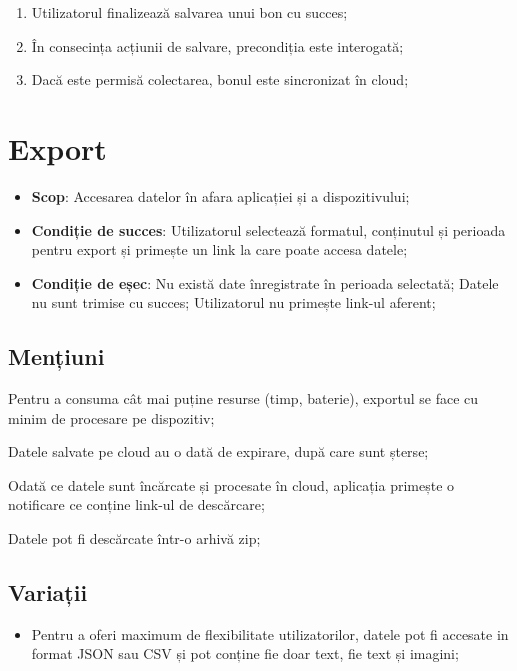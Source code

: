 \begin{enumerate}
\item
  Utilizatorul finalizează salvarea unui bon cu succes;
\item
  În consecința acțiunii de salvare, precondiția este interogată;
\item
  Dacă este permisă colectarea, bonul este sincronizat în cloud;
\end{enumerate}

\section{Export}\label{export}

\begin{itemize}
\item
  \textbf{Scop}: Accesarea datelor în afara aplicației și a dispozitivului;
\item
  \textbf{Condiție de succes}: Utilizatorul selectează formatul, conținutul și perioada pentru export și primește un link la care poate accesa datele;
\item
  \textbf{Condiție de eșec}: Nu există date înregistrate în perioada selectată; Datele nu sunt trimise cu succes; Utilizatorul nu primește link-ul aferent;
\end{itemize}

\subsection{Mențiuni}\label{menux21biuni-3}

Pentru a consuma cât mai puține resurse (timp, baterie), exportul se face cu minim de procesare pe dispozitiv;

Datele salvate pe cloud au o dată de expirare, după care sunt șterse;

Odată ce datele sunt încărcate și procesate în cloud, aplicația primește o notificare ce conține link-ul de descărcare;

Datele pot fi descărcate într-o arhivă zip;

\subsection{Variații}\label{variaux21bii-2}

\begin{itemize}
\item
  Pentru a oferi maximum de flexibilitate utilizatorilor, datele pot fi accesate in format JSON sau CSV și pot conține fie doar text, fie text și imagini;
\end{itemize}

